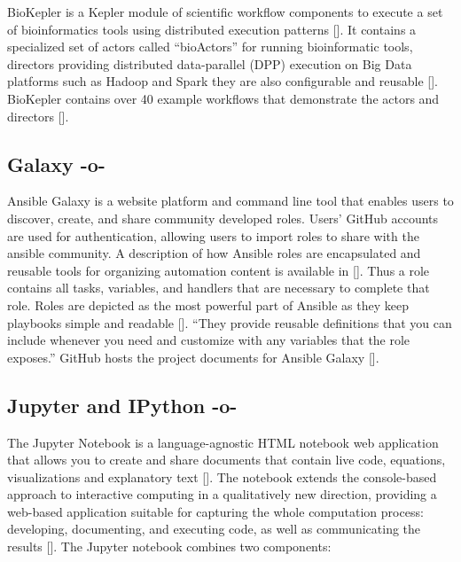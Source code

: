 BioKepler is a Kepler module of scientific workflow components to
execute a set of bioinformatics tools using distributed execution
patterns [\cite{www-biokepler}]. It contains a specialized set of actors
called ``bioActors'' for running bioinformatic tools, directors
providing distributed data-parallel (DPP) execution on Big Data
platforms such as Hadoop and Spark they are also configurable and
reusable [\cite{www-biokepler-demos}]. BioKepler contains over 40
example workflows that demonstrate the actors and
directors [\cite{bioActors}].


    
\subsection{Galaxy -o-}

Ansible Galaxy is a website platform and command line tool that
enables users to discover, create, and share community developed
roles. Users' GitHub accounts are used for authentication, allowing
users to import roles to share with the ansible community. A
description of how Ansible roles are encapsulated and reusable tools
for organizing automation content is available
in [\cite{www-galaxy-ansible}]. Thus a role contains all tasks,
variables, and handlers that are necessary to complete that
role. Roles are depicted as the most powerful part of Ansible as they
keep playbooks simple and readable [\cite{Ansible-book-2016}]. ``They
provide reusable definitions that you can include whenever you need
and customize with any variables that the role exposes.'' GitHub hosts
the project documents for Ansible Galaxy [\cite{www-github-galaxy}].




\subsection{Jupyter and IPython -o-}

The Jupyter Notebook is a language-agnostic HTML notebook web
application that allows you to create and share documents that contain
live code, equations, visualizations and explanatory
text [\cite{www-jupyter-1}]. The notebook extends the console-based
approach to interactive computing in a qualitatively new direction,
providing a web-based application suitable for capturing the whole
computation process: developing, documenting, and executing code, as
well as communicating the results [\cite{www-jupyter-2}]. The Jupyter
notebook combines two components:
    
